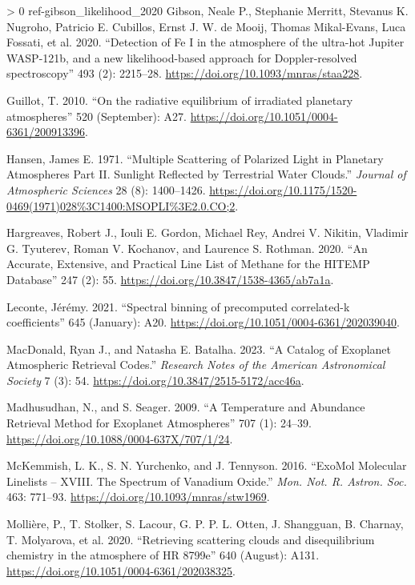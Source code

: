 \documentclass[10pt,a4paper,onecolumn]{article}
\newlength{\cslhangindent}
\newenvironment{CSLReferences}[3] %
 {%
  \setlength{\parindent}{0pt}
  \ifodd #1 \everypar{\setlength{\hangindent}{\cslhangindent}}\ignorespaces\fi
  \ifnum #2 > 0
  \setlength{\parskip}{#2\baselineskip}
  \fi
 }%
 {}
\begin{document}
\begin{CSLReferences}{1}{0}
\hypertarget{ref-gibson_likelihood_2020}{}%
Gibson, Neale P., Stephanie Merritt, Stevanus K. Nugroho, Patricio E.
Cubillos, Ernst J. W. de Mooij, Thomas Mikal-Evans, Luca Fossati, et al.
2020. {``{Detection of Fe I in the atmosphere of the ultra-hot Jupiter
WASP-121b, and a new likelihood-based approach for Doppler-resolved
spectroscopy}''} 493 (2): 2215--28.
\url{https://doi.org/10.1093/mnras/staa228}.

\hypertarget{ref-guillot2010}{}%
Guillot, T. 2010. {``{On the radiative equilibrium of irradiated
planetary atmospheres}''} 520 (September): A27.
\url{https://doi.org/10.1051/0004-6361/200913396}.

\hypertarget{ref-hansen1971}{}%
Hansen, James E. 1971. {``{Multiple Scattering of Polarized Light in
Planetary Atmospheres Part II. Sunlight Reflected by Terrestrial Water
Clouds.}''} \emph{Journal of Atmospheric Sciences} 28 (8): 1400--1426.
\url{https://doi.org/10.1175/1520-0469(1971)028%3C1400:MSOPLI%3E2.0.CO;2}.

\hypertarget{ref-hargreaves2020}{}%
Hargreaves, Robert J., Iouli E. Gordon, Michael Rey, Andrei V. Nikitin,
Vladimir G. Tyuterev, Roman V. Kochanov, and Laurence S. Rothman. 2020.
{``{An Accurate, Extensive, and Practical Line List of Methane for the
HITEMP Database}''} 247 (2): 55.
\url{https://doi.org/10.3847/1538-4365/ab7a1a}.

\hypertarget{ref-leconte2021}{}%
Leconte, Jérémy. 2021. {``{Spectral binning of precomputed correlated-k
coefficients}''} 645 (January): A20.
\url{https://doi.org/10.1051/0004-6361/202039040}.

\hypertarget{ref-macdonald_catalog_2023}{}%
MacDonald, Ryan J., and Natasha E. Batalha. 2023. {``{A Catalog of
Exoplanet Atmospheric Retrieval Codes}.''} \emph{Research Notes of the
American Astronomical Society} 7 (3): 54.
\url{https://doi.org/10.3847/2515-5172/acc46a}.

\hypertarget{ref-madu2009}{}%
Madhusudhan, N., and S. Seager. 2009. {``{A Temperature and Abundance
Retrieval Method for Exoplanet Atmospheres}''} 707 (1): 24--39.
\url{https://doi.org/10.1088/0004-637X/707/1/24}.

\hypertarget{ref-mckemmish2016}{}%
McKemmish, L. K., S. N. Yurchenko, and J. Tennyson. 2016. {``{ExoMol}
{Molecular} Linelists -- {XVIII}. {The} Spectrum of {Vanadium}
{Oxide}.''} \emph{Mon. Not. R. Astron. Soc.} 463: 771--93.
\url{https://doi.org/10.1093/mnras/stw1969}.

\hypertarget{ref-molliere2020}{}%
Mollière, P., T. Stolker, S. Lacour, G. P. P. L. Otten, J. Shangguan, B.
Charnay, T. Molyarova, et al. 2020. {``{Retrieving scattering clouds and
disequilibrium chemistry in the atmosphere of HR 8799e}''} 640 (August):
A131. \url{https://doi.org/10.1051/0004-6361/202038325}.


\end{CSLReferences}
\end{document}
